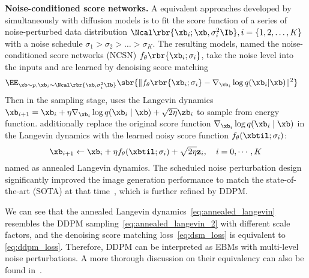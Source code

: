 \textbf{Noise-conditioned score networks.}
A equivalent approaches developed by \citet{song2019generative} simultaneously with diffusion models is to fit the score function of a series of noise-perturbed data distribution $\Ncal\rbr{\xb_i;\xb, \sigma_i^2 \Ib}, i=\{1,2,\dots, K\}$ with a noise schedule $\sigma_1> \sigma_2>\dots>\sigma_K$. 
The resulting models, named the noise-conditioned score networks (NCSN) $f_\theta\rbr{\xb_i;\sigma_i}$, take the noise level into the inputs and are learned by denoising score matching~\cite{vincent2011connection}
\begin{align}
    &\EE_{\xb\sim p,\xb_i\sim\Ncal\rbr{\xb,\sigma_i^2 \Ib}}\sbr{\|f_\theta\rbr{\xb_i;\sigma_i} -\nabla_{\xb_i}\log q(\xb_i|\xb) \|^2}\label{eq:dsm_loss}
\end{align}
Then in the sampling stage, \citet{song2019generative} uses the Langevin dynamics $\xb_{i+1} = \xb_{i} + \eta \nabla_{\xb_{i}}\log q(\xb_{i} \mid \xb) + \sqrt{2 \eta}\zb_i$ to sample from energy function. \citet{song2019generative} additionally replace the original score function $\nabla_{\xb_{i}}\log q(\xb_{i} \mid \xb)$ in the Langevin dynamics with the learned noisy score function $f_\theta(\xbtil;\sigma_i)$:
\begin{equation}
    \xb_{i+1} \leftarrow \xb_i+\eta f_\theta(\xbtil;\sigma_i)+\sqrt{2 \eta} \mathbf{z}_i, \quad i=0,\cdots, K\label{eq:annealed_langevin}
\end{equation}
named as annealed Langevin dynamics. The scheduled noise perturbation design significantly improved the image generation performance to match the state-of-the-art (SOTA) at that time~\cite{song2019generative}, which is further refined by DDPM.

We can see that the annealed Langevin dynamics~\eqref{eq:annealed_langevin} resembles the DDPM sampling~\eqref{eq:annealed_langevin_2} with different scale factors, and the denoising score matching loss~\eqref{eq:dsm_loss} is equivalent to \eqref{eq:ddpm_loss}. Therefore, DDPM can be interpreted as EBMs with multi-level noise perturbations. A more thorough discussion on their equivalency can also be found in~\citet{ho2020denoising,song2021scorebased}.

